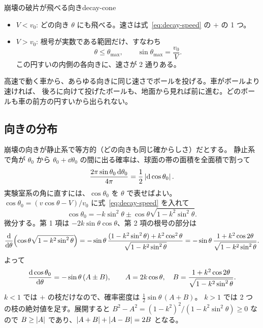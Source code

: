 \begin{result}{崩壊の破片が飛べる向き}{decay-cone}
\begin{itemize}
  \item $V<v_0$: どの向き $\theta$ にも飛べる。速さは式~\eqref{eq:decay-speed} の $+$ の 1 つ。
  \item $V>v_0$: 根号が実数である範囲だけ、すなわち
  \begin{equation}
    \theta\le\theta_{\max},\qquad\sin\theta_{\max}=\frac{v_0}{V}.
    \label{eq:decay-thmax}
  \end{equation}
  この円すいの内側の各向きに、速さが 2 通りある。
\end{itemize}
\end{result}

\begin{intuition}
高速で動く車から、あらゆる向きに同じ速さでボールを投げる。車がボールより速ければ、
後ろに向けて投げたボールも、地面から見れば前に進む。どのボールも車の前方の円すいから出られない。
\end{intuition}

\subsection{向きの分布}\label{sec:decay-distribution}

崩壊の向きが静止系で等方的（どの向きも同じ確からしさ）だとする。
静止系で角が $\theta_0$ から $\theta_0+\dd\theta_0$ の間に出る確率は、球面の帯の面積を全面積で割って
\begin{equation}
  \frac{2\pi\sin\theta_0\,\mathrm{d}\theta_0}{4\pi}=\frac12\left\lvert \mathrm{d}\cos\theta_0\right\rvert.
\end{equation}
実験室系の角に直すには、$\cos\theta_0$ を $\theta$ で表せばよい。
$\cos\theta_0=(v\cos\theta-V)/v_0$ に式~\eqref{eq:decay-speed} を入れて
\begin{equation}
  \cos\theta_0=-k\sin^2\theta\pm\cos\theta\sqrt{1-k^2\sin^2\theta}.
\end{equation}
微分する。第 1 項は $-2k\sin\theta\cos\theta$、第 2 項の根号の部分は
\begin{equation}
  \frac{\mathrm{d} }{\mathrm{d} \theta}\Bigl(\cos\theta\sqrt{1-k^2\sin^2\theta}\Bigr)
  =-\sin\theta\,\frac{(1-k^2\sin^2\theta)+k^2\cos^2\theta}{\sqrt{1-k^2\sin^2\theta}}
  =-\sin\theta\,\frac{1+k^2\cos2\theta}{\sqrt{1-k^2\sin^2\theta}} .
\end{equation}
よって
\begin{equation}
  \frac{\mathrm{d} \cos\theta_0}{\mathrm{d} \theta}=-\sin\theta\,(A\pm B),\qquad
  A=2k\cos\theta,\quad B=\frac{1+k^2\cos2\theta}{\sqrt{1-k^2\sin^2\theta}} .
\end{equation}
$k<1$ では $+$ の枝だけなので、確率密度は $\tfrac12\sin\theta\,(A+B)$。
$k>1$ では 2 つの枝の絶対値を足す。展開すると $B^2-A^2=(1-k^2)^2/(1-k^2\sin^2\theta)\ge0$ なので
$B\ge\left\lvert A\right\rvert$ であり、$\left\lvert A+B\right\rvert+\left\lvert A-B\right\rvert=2B$ となる。

